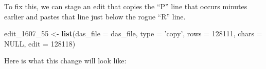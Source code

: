 \documentclass[
]{book}
\newenvironment{Shaded}{\begin{snugshade}}{\end{snugshade}}
\newcommand{\DataTypeTok}[1]{\textcolor[rgb]{0.13,0.29,0.53}{#1}}
\newcommand{\DecValTok}[1]{\textcolor[rgb]{0.00,0.00,0.81}{#1}}
\newcommand{\KeywordTok}[1]{\textcolor[rgb]{0.13,0.29,0.53}{\textbf{#1}}}
\newcommand{\NormalTok}[1]{#1}
\newcommand{\OtherTok}[1]{\textcolor[rgb]{0.56,0.35,0.01}{#1}}
\newcommand{\StringTok}[1]{\textcolor[rgb]{0.31,0.60,0.02}{#1}}
\begin{document}
To fix this, we can stage an edit that copies the ``P'' line that occurs minutes earlier and pastes that line just below the rogue ``R'' line.

\begin{Shaded}
\begin{Highlighting}[]
\NormalTok{edit_}\DecValTok{1607}\NormalTok{_}\DecValTok{55}\NormalTok{ <-}\StringTok{ }
\StringTok{  }\KeywordTok{list}\NormalTok{(}\DataTypeTok{das_file =}\NormalTok{ das_file,}
       \DataTypeTok{type =} \StringTok{'copy'}\NormalTok{,}
       \DataTypeTok{rows =} \DecValTok{128111}\NormalTok{,}
       \DataTypeTok{chars =} \OtherTok{NULL}\NormalTok{,}
       \DataTypeTok{edit =} \DecValTok{128118}\NormalTok{)}
\end{Highlighting}
\end{Shaded}

Here is what this change will look like:
\end{document}
